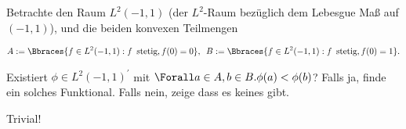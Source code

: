 \begin{exercise}

Betrachte den Raum $L^2(-1, 1)$ (der $L^2$-Raum bezüglich dem Lebesgue Maß auf $(-1, 1)$), und die beiden konvexen Teilmengen

\begin{align*}
  A := \Bbraces{f \in L^2(-1, 1): f \enspace \text{stetig}, f(0) = 0},
  \enspace
  B := \Bbraces{f \in L^2(-1, 1): f \enspace \text{stetig}, f(0) = 1}.
\end{align*}

Existiert $\phi \in L^2(-1, 1)^\prime$ mit $\Forall a \in A, b \in B. \phi(a) < \phi(b)$?
Falls ja, finde ein solches Funktional.
Falls nein, zeige dass es keines gibt.

\end{exercise}

\begin{solution}

Trivial!

\end{solution}
